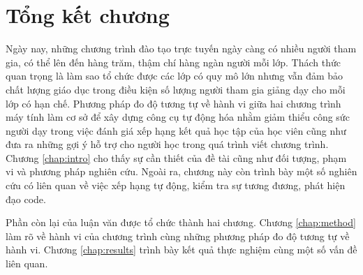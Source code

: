 \section*{Tổng kết chương}

Ngày nay, những chương trình đào tạo trực tuyến ngày càng có nhiều
người tham gia, có thể lên đến hàng trăm, thậm chí hàng ngàn người mỗi
lớp. Thách thức quan trọng là làm sao tổ chức được các lớp có quy mô
lớn nhưng vẫn đảm bảo chất lượng giáo dục trong điều kiện số lượng
người tham gia giảng dạy cho mỗi lớp có hạn chế. Phương pháp đo độ
tương tự về hành vi giữa hai chương trình máy tính làm cơ sở để xây
dựng công cụ tự động hóa nhằm giảm thiểu công sức người dạy trong việc
đánh giá xếp hạng kết quả học tập của học viên cũng như đưa ra những
gợi ý hỗ trợ cho người học trong quá trình viết chương trình.
Chương \ref{chap:intro} cho thấy sự cần thiết của đề tài cũng như đối tượng, phạm vi và phương pháp nghiên cứu. Ngoài ra, chương này còn trình bày một số nghiên cứu có liên quan về việc xếp hạng tự động, kiểm tra sự tương đương, phát hiện đạo code.

Phần còn lại của luận văn được tổ chức thành hai chương. Chương
\ref{chap:method} làm rõ về hành vi của chương trình cùng những phương
pháp đo độ tương tự về hành vi. Chương \ref{chap:results} trình bày
kết quả thực nghiệm cùng một số vấn đề liên quan.





